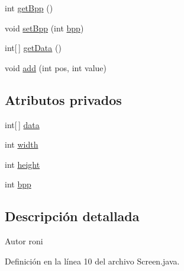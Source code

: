 \begin{DoxyCompactItemize}
int \hyperlink{classes_1_1ucm_1_1tfg_1_1controlremotolinux_1_1client_1_1model_1_1Screen_a453931efd039eb60140efcb6e844f2ec}{get\-Bpp} ()
\item 
void \hyperlink{classes_1_1ucm_1_1tfg_1_1controlremotolinux_1_1client_1_1model_1_1Screen_a236f1411a5edac77646e5b9499ff2ed6}{set\-Bpp} (int \hyperlink{classes_1_1ucm_1_1tfg_1_1controlremotolinux_1_1client_1_1model_1_1Screen_a126efcd618ec63cee5f4ffcf5e05d247}{bpp})
\item 
int\mbox{[}$\,$\mbox{]} \hyperlink{classes_1_1ucm_1_1tfg_1_1controlremotolinux_1_1client_1_1model_1_1Screen_aacbe6717307e25f408e364c920b1fb8f}{get\-Data} ()
\item 
void \hyperlink{classes_1_1ucm_1_1tfg_1_1controlremotolinux_1_1client_1_1model_1_1Screen_a9acce003570ff652dc06af9c0ec50f25}{add} (int pos, int value)
\end{DoxyCompactItemize}
\subsection*{Atributos privados}
\begin{DoxyCompactItemize}
\item 
int\mbox{[}$\,$\mbox{]} \hyperlink{classes_1_1ucm_1_1tfg_1_1controlremotolinux_1_1client_1_1model_1_1Screen_a9dfbbee16f33137483d67ab15ebd5adb}{data}
\item 
int \hyperlink{classes_1_1ucm_1_1tfg_1_1controlremotolinux_1_1client_1_1model_1_1Screen_ae670efacad579788a6f2520a9b28ab15}{width}
\item 
int \hyperlink{classes_1_1ucm_1_1tfg_1_1controlremotolinux_1_1client_1_1model_1_1Screen_a8c3d5e32772854cbe34a7e7d090537f9}{height}
\item 
int \hyperlink{classes_1_1ucm_1_1tfg_1_1controlremotolinux_1_1client_1_1model_1_1Screen_a126efcd618ec63cee5f4ffcf5e05d247}{bpp}
\end{DoxyCompactItemize}


\subsection{Descripción detallada}
\begin{DoxyAuthor}{Autor}
roni 
\end{DoxyAuthor}


Definición en la línea 10 del archivo Screen.\-java.



